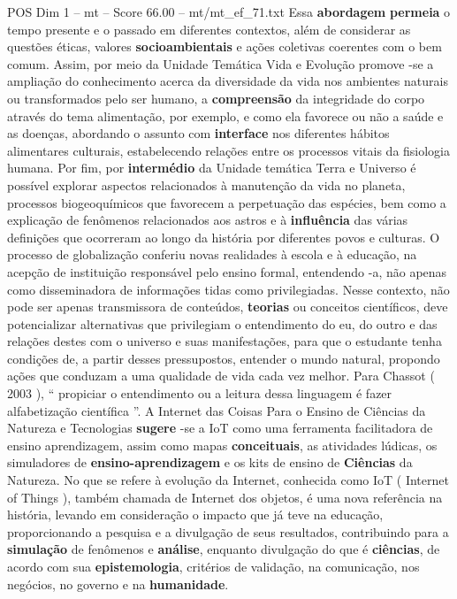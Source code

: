 \begin{textsample}{POS Dim 1 – mt – Score 66.00 – mt/mt\_ef\_71.txt}
Essa \textbf{abordagem} \textbf{permeia} o tempo presente e o passado em diferentes contextos, além de considerar as questões éticas, valores \textbf{socioambientais} e ações coletivas coerentes com o bem comum.
Assim, por meio da Unidade Temática Vida e Evolução promove -se a ampliação do conhecimento acerca da diversidade da vida nos ambientes naturais ou transformados pelo ser humano, a \textbf{compreensão} da integridade do corpo através do tema alimentação, por exemplo, e como ela favorece ou não a saúde e as doenças, abordando o assunto com \textbf{interface} nos diferentes hábitos alimentares culturais, estabelecendo relações entre os processos vitais da fisiologia humana.
Por fim, por \textbf{intermédio} da Unidade temática Terra e Universo é possível explorar aspectos relacionados à manutenção da vida no planeta, processos biogeoquímicos que favorecem a perpetuação das espécies, bem como a explicação de fenômenos relacionados aos astros e à \textbf{influência} das várias definições que ocorreram ao longo da história por diferentes povos e culturas.
O processo de globalização conferiu novas realidades à escola e à educação, na acepção de instituição responsável pelo ensino formal, entendendo -a, não apenas como disseminadora de informações tidas como privilegiadas.
Nesse contexto, não pode ser apenas transmissora de conteúdos, \textbf{teorias} ou conceitos científicos, deve potencializar alternativas que privilegiam o entendimento do eu, do outro e das relações destes com o universo e suas manifestações, para que o estudante tenha condições de, a partir desses pressupostos, entender o mundo natural, propondo ações que conduzam a uma qualidade de vida cada vez melhor.
Para Chassot ( 2003 ), “ propiciar o entendimento ou a leitura dessa linguagem é fazer alfabetização científica ”.
A Internet das Coisas Para o Ensino de Ciências da Natureza e Tecnologias \textbf{sugere} -se a IoT como uma ferramenta facilitadora de ensino aprendizagem, assim como mapas \textbf{conceituais}, as atividades lúdicas, os simuladores de \textbf{ensino-aprendizagem} e os kits de ensino de \textbf{Ciências} da Natureza.
No que se refere à evolução da Internet, conhecida como IoT ( Internet of Things ), também chamada de Internet dos objetos, é uma nova referência na história, levando em consideração o impacto que já teve na educação, proporcionando a pesquisa e a divulgação de seus resultados, contribuindo para a \textbf{simulação} de fenômenos e \textbf{análise}, enquanto divulgação do que é \textbf{ciências}, de acordo com sua \textbf{epistemologia}, critérios de validação, na comunicação, nos negócios, no governo e na \textbf{humanidade}.

\end{textsample}
